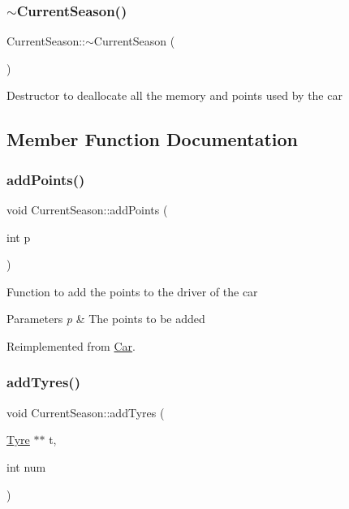 \subsubsection{\texorpdfstring{$\sim$\+Current\+Season()}{~CurrentSeason()}}
{\footnotesize\ttfamily Current\+Season\+::$\sim$\+Current\+Season (\begin{DoxyParamCaption}{ }\end{DoxyParamCaption})}

Destructor to deallocate all the memory and points used by the car 

\subsection{Member Function Documentation}
\mbox{\label{classCurrentSeason_a2ae9598222bc7aba71040775c019f297}} 
\subsubsection{\texorpdfstring{add\+Points()}{addPoints()}}
{\footnotesize\ttfamily void Current\+Season\+::add\+Points (\begin{DoxyParamCaption}\item[{int}]{p }\end{DoxyParamCaption})\hspace{0.3cm}{\ttfamily [virtual]}}

Function to add the points to the driver of the car 
\begin{DoxyParams}{Parameters}
{\em p} & The points to be added \\
\hline
\end{DoxyParams}


Reimplemented from \hyperlink{classCar_a946872fcdb7625c343e5caf90fa39617}{Car}.

\mbox{\label{classCurrentSeason_a62e6e6c10c5490084230d4c3722196e5}} 
\subsubsection{\texorpdfstring{add\+Tyres()}{addTyres()}}
{\footnotesize\ttfamily void Current\+Season\+::add\+Tyres (\begin{DoxyParamCaption}\item[{\hyperlink{classTyre}{Tyre} $\ast$$\ast$}]{t,  }\item[{int}]{num }\end{DoxyParamCaption})\hspace{0.3cm}{\ttfamily [virtual]}}

